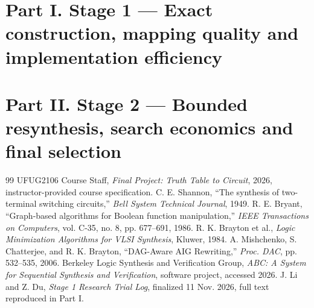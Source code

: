 \documentclass[a4paper,10pt]{article}
\theoremstyle{definition}
\theoremstyle{remark}
\begin{document}

\setcounter{tocdepth}{1}
\setcounter{secnumdepth}{2}
\tableofcontents
\clearpage
\part*{Part I. Stage 1 --- Exact construction, mapping quality and implementation efficiency}

\clearpage
\part*{Part II. Stage 2 --- Bounded resynthesis, search economics and final selection}



\clearpage
\begin{thebibliography}{99}
 UFUG2106 Course Staff, \emph{Final Project: Truth Table to Circuit}, 2026, instructor-provided course specification.
 C. E. Shannon, ``The synthesis of two-terminal switching circuits,'' \emph{Bell System Technical Journal}, 1949.
 R. E. Bryant, ``Graph-based algorithms for Boolean function manipulation,'' \emph{IEEE Transactions on Computers}, vol. C-35, no. 8, pp. 677--691, 1986.
 R. K. Brayton et al., \emph{Logic Minimization Algorithms for VLSI Synthesis}, Kluwer, 1984.
 A. Mishchenko, S. Chatterjee, and R. K. Brayton, ``DAG-Aware AIG Rewriting,'' \emph{Proc. DAC}, pp. 532--535, 2006.
 Berkeley Logic Synthesis and Verification Group, \emph{ABC: A System for Sequential Synthesis and Verification}, software project, accessed 2026.
 J. Li and Z. Du, \emph{Stage 1 Research Trial Log}, finalized 11 Nov. 2026, full text reproduced in Part I.
\end{thebibliography}
\end{document}
